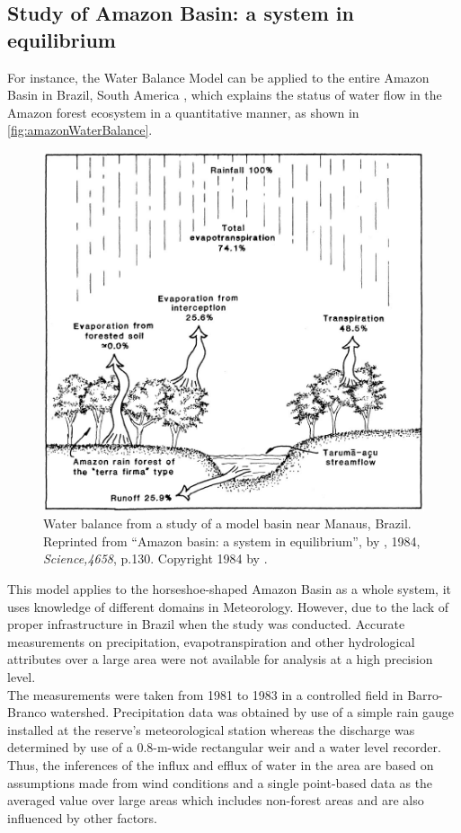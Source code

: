 \subsection{Study of Amazon Basin: a system in equilibrium}
For instance, the Water Balance Model can be applied to the entire Amazon Basin in Brazil, South America  \citep{Salati1984a}, which explains the status of water flow in the Amazon forest ecosystem in a quantitative manner, as shown in \autoref{fig:amazonWaterBalance}. 
\begin{figure}[bth]
\begin{center}
\includegraphics[width=.75\linewidth]{gfx/amazonWaterBalance}
\end{center}
\caption{Water balance from a study of a model basin near Manaus, Brazil\citep{Leopoldo1982}. Reprinted from ``Amazon basin: a system in equilibrium'', by \citeauthor{Salati1984a}, 1984, \emph{Science,4658}, p.130. Copyright 1984 by \citeauthor{Salati1984a}.  }
\label{fig:amazonWaterBalance}
\end{figure}
\newline
This model applies to the horseshoe-shaped Amazon Basin as a whole system, it uses knowledge of different domains in Meteorology. However, due to the lack of proper infrastructure in Brazil when the study was conducted. Accurate measurements on precipitation, evapotranspiration and other hydrological attributes over a large area were not available for analysis at a high precision level. \\
\newline
The measurements were taken from 1981 to 1983 in a controlled field in Barro-Branco watershed\citep{Leopoldo1995}. Precipitation data was obtained by use of a simple rain gauge installed at the reserve's meteorological station whereas the discharge was determined by use of a 0.8-m-wide rectangular weir and a water level recorder. Thus, the inferences of the influx and efflux of water in the area are based on assumptions made from wind conditions and a single point-based data as the averaged value over large areas which includes non-forest areas and are also influenced by other factors. 

